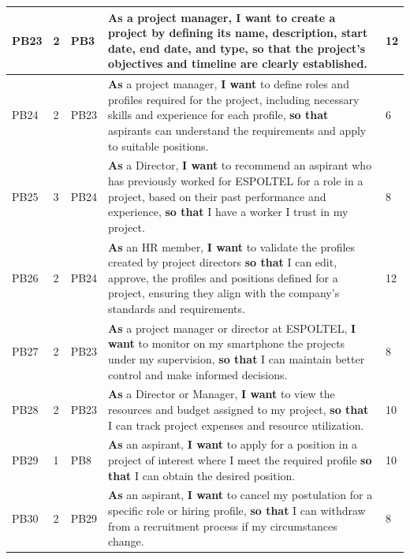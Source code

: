 \documentclass{scrreprt}
\begin{document}
\begin{longtable}{|p{0.8cm}|p{1.5cm}|p{2.5cm}|p{8cm}|p{2cm}|}
	PB23 & 2 & PB3 & \textbf{As} a project manager, \textbf{I want} to create a project by defining its name, description, start date, end date, and type, \textbf{so that} the project's objectives and timeline are clearly established. & 12 \\ \hline
	PB24 & 2 & PB23 & \textbf{As} a project manager, \textbf{I want} to define roles and profiles required for the project, including necessary skills and experience for each profile, \textbf{so that} aspirants can understand the requirements and apply to suitable positions. & 6 \\ \hline
	PB25 & 3 & PB24 & \textbf{As} a Director, \textbf{I want} to recommend an aspirant who has previously worked for ESPOLTEL for a role in a project, based on their past performance and experience, \textbf{so that} I have a worker I trust in my project. & 8 \\ \hline
	PB26 & 2 & PB24 & \textbf{As} an HR member, \textbf{I want} to validate the profiles created by project directors \textbf{so that} I can edit, approve, the profiles and positions defined for a project, ensuring they align with the company's standards and requirements. & 12 \\ \hline
	PB27 & 2 & PB23 & \textbf{As} a project manager or director at ESPOLTEL, \textbf{I want} to monitor on my smartphone the projects under my supervision, \textbf{so that} I can maintain better control and make informed decisions. & 8 \\ \hline
	PB28 & 2 & PB23 & \textbf{As} a Director or Manager, \textbf{I want} to view the resources and budget assigned to my project, \textbf{so that} I can track project expenses and resource utilization. & 10 \\ \hline

	PB29 & 1 & PB8 & \textbf{As} an aspirant, \textbf{I want} to apply for a position in a project of interest where I meet the required profile \textbf{so that} I can obtain the desired position. & 10 \\ \hline
	PB30& 2 & PB29 & \textbf{As} an aspirant, \textbf{I want} to cancel my postulation for a specific role or hiring profile, \textbf{so that} I can withdraw from a recruitment process if my circumstances change. & 8 \\ \hline
	

\end{longtable}
\end{document}
